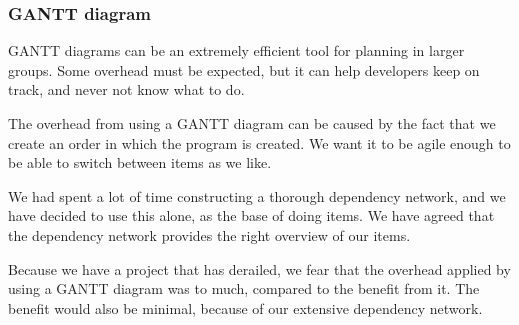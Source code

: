 \subsubsection{GANTT diagram}
GANTT diagrams can be an extremely efficient tool for planning in larger groups. Some overhead must be expected, but it can help developers keep on track, and never not know what to do.

The overhead from using a GANTT diagram can be caused by the fact that we create an order in which the program is created. We want it to be agile enough to be able to switch between items as we like.

We had spent a lot of time constructing a thorough dependency network, and we have decided to use this alone, as the base of doing items. We have agreed that the dependency network provides the right overview of our items.

Because we have a project that has derailed, we fear that the overhead applied by using a GANTT diagram was to much, compared to the benefit from it. The benefit would also be minimal, because of our extensive dependency network.